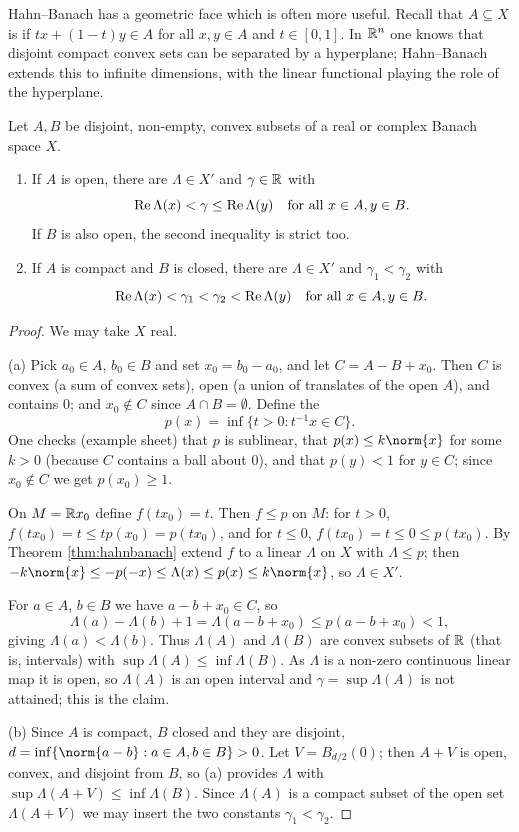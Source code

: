 \documentclass[a4paper]{scrartcl}
\begin{document}
Hahn--Banach has a geometric face which is often more useful. Recall that $A \subseteq X$ is  if $tx + (1-t)y \in A$ for all $x,y \in A$ and $t \in [0,1]$. In $\mathbb{R}^n$ one knows that disjoint compact convex sets can be separated by a hyperplane; Hahn--Banach extends this to infinite dimensions, with the linear functional playing the role of the hyperplane.

\begin{theorem}\label{thm:geomhb}
	Let $A, B$ be disjoint, non-empty, convex subsets of a real or complex Banach space $X$.
	\begin{enumerate}[label=(\alph*)]
		\item If $A$ is open, there are $\Lambda \in X'$ and $\gamma \in \mathbb{R}$ with
		$$\operatorname{Re} \Lambda(x) < \gamma \le \operatorname{Re} \Lambda(y) \quad \text{for all } x \in A, y \in B.$$
		If $B$ is also open, the second inequality is strict too.
		\item If $A$ is compact and $B$ is closed, there are $\Lambda \in X'$ and $\gamma_1 < \gamma_2$ with
		$$\operatorname{Re} \Lambda(x) < \gamma_1 < \gamma_2 < \operatorname{Re} \Lambda(y) \quad \text{for all } x \in A, y \in B.$$
	\end{enumerate}
\end{theorem}

\begin{proof}
	We may take $X$ real.

	(a) Pick $a_0 \in A$, $b_0 \in B$ and set $x_0 = b_0 - a_0$, and let $C = A - B + x_0$. Then $C$ is convex (a sum of convex sets), open (a union of translates of the open $A$), and contains $0$; and $x_0 \notin C$ since $A \cap B = \emptyset$. Define the 
	$$p(x) = \inf\{t > 0 : t^{-1}x \in C\}.$$
	One checks (example sheet) that $p$ is sublinear, that $p(x) \le k \norm{x}$ for some $k > 0$ (because $C$ contains a ball about $0$), and that $p(y) < 1$ for $y \in C$; since $x_0 \notin C$ we get $p(x_0)\ge 1$.

	On $M = \mathbb{R} x_0$ define $f(tx_0) = t$. Then $f \le p$ on $M$: for $t > 0$, $f(tx_0) = t \le tp(x_0) = p(tx_0)$, and for $t \le 0$, $f(tx_0) = t \le 0 \le p(tx_0)$. By Theorem \ref{thm:hahnbanach} extend $f$ to a linear $\Lambda$ on $X$ with $\Lambda \le p$; then $-k\norm{x} \le -p(-x) \le \Lambda(x) \le p(x) \le k\norm{x}$, so $\Lambda \in X'$.

	For $a \in A$, $b\in B$ we have $a - b + x_0 \in C$, so
	$$\Lambda(a) - \Lambda(b) + 1 = \Lambda(a - b + x_0) \le p(a-b+x_0) < 1,$$
	giving $\Lambda(a) < \Lambda(b)$. Thus $\Lambda(A)$ and $\Lambda(B)$ are convex subsets of $\mathbb{R}$ (that is, intervals) with $\sup \Lambda(A) \le \inf \Lambda(B)$. As $\Lambda$ is a non-zero continuous linear map it is open, so $\Lambda(A)$ is an open interval and $\gamma = \sup\Lambda(A)$ is not attained; this is the claim.

	(b) Since $A$ is compact, $B$ closed and they are disjoint, $d = \inf\{\norm{a-b} : a \in A, b\in B\} > 0$. Let $V = B_{d/2}(0)$; then $A + V$ is open, convex, and disjoint from $B$, so (a) provides $\Lambda$ with $\sup \Lambda(A+V) \le \inf \Lambda(B)$. Since $\Lambda(A)$ is a compact subset of the open set $\Lambda(A+V)$ we may insert the two constants $\gamma_1 < \gamma_2$.
\end{proof}
\end{document}
